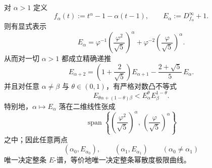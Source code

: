 \begin{theorem}\label{thm:conclusion-power-divergence-secondorder-recurrence}
对 \(\alpha>1\) 定义
\[
f_\alpha(t):=t^\alpha-1-\alpha(t-1),
\qquad
E_\alpha:=D_{f_\alpha}^\infty+1.
\]
则有显式表示
\[
E_\alpha
=
\varphi^{-1}\left(\frac{\varphi^2}{\sqrt5}\right)^\alpha
+
\varphi^{-2}\left(\frac{\varphi}{\sqrt5}\right)^\alpha.
\]
从而对一切 \(\alpha>1\) 都成立精确递推
\[
\boxed{\;
E_{\alpha+2}
=
\left(1+\frac{2}{\sqrt5}\right)E_{\alpha+1}
-\frac{2+\sqrt5}{5}\,E_\alpha.\;}
\]
并且对任意 \(\alpha\neq \beta\) 与 \(\theta\in(0,1)\)，有严格对数凸不等式
\[
\boxed{\;
E_{\theta\alpha+(1-\theta)\beta}
<
E_\alpha^\theta E_\beta^{1-\theta}.\;}
\]
特别地，\(\alpha\mapsto E_\alpha\) 落在二维线性张成
\[
\operatorname{span}\left\{
\left(\frac{\varphi^2}{\sqrt5}\right)^\alpha,\,
\left(\frac{\varphi}{\sqrt5}\right)^\alpha
\right\}
\]
之中；因此任意两点
\[
(\alpha_0,E_{\alpha_0}),\qquad (\alpha_1,E_{\alpha_1})
\qquad (\alpha_0\neq \alpha_1)
\]
唯一决定整条 \(E\)-谱，等价地唯一决定整条幂散度极限曲线。
\end{theorem}
